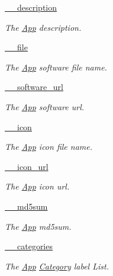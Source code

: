 \begin{CompactItemize}
\hyperlink{classwinsollib_1_1App_3d6590ce450fc5acfcf7d5fba34db99b}{\_\-\_\-description}
\begin{CompactList}\small\item\em The \hyperlink{classwinsollib_1_1App}{App} description. \item\end{CompactList}\item 
\hyperlink{classwinsollib_1_1App_990bdcf7f9b5aca225afcf2f51d8a89a}{\_\-\_\-file}
\begin{CompactList}\small\item\em The \hyperlink{classwinsollib_1_1App}{App} software file name. \item\end{CompactList}\item 
\hyperlink{classwinsollib_1_1App_652377c5723ddd9a0df9a1f0ab257bee}{\_\-\_\-software\_\-url}
\begin{CompactList}\small\item\em The \hyperlink{classwinsollib_1_1App}{App} software url. \item\end{CompactList}\item 
\hyperlink{classwinsollib_1_1App_985fae142ceb59f18d79374b0752e47e}{\_\-\_\-icon}
\begin{CompactList}\small\item\em The \hyperlink{classwinsollib_1_1App}{App} icon file name. \item\end{CompactList}\item 
\hyperlink{classwinsollib_1_1App_b45d604f6fe1e467838c367008a509cc}{\_\-\_\-icon\_\-url}
\begin{CompactList}\small\item\em The \hyperlink{classwinsollib_1_1App}{App} icon url. \item\end{CompactList}\item 
\hyperlink{classwinsollib_1_1App_fde8367a61f0604aba66fc328f15bb61}{\_\-\_\-md5sum}
\begin{CompactList}\small\item\em The \hyperlink{classwinsollib_1_1App}{App} md5sum. \item\end{CompactList}\item 
\hyperlink{classwinsollib_1_1App_b4d2c14dc071e723f8f0904530af0df1}{\_\-\_\-categories}
\begin{CompactList}\small\item\em The \hyperlink{classwinsollib_1_1App}{App} \hyperlink{classwinsollib_1_1Category}{Category} label List. \item\end{CompactList}\item 

\end{CompactItemize}
